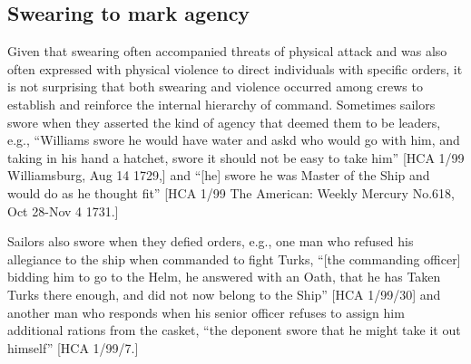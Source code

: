 \subsection{\textbf{Swearing} \textbf{to} \textbf{mark} \textbf{agency}}%

  Given that swearing often accompanied threats of physical attack and was also often expressed with physical violence to direct individuals with specific orders, it is not surprising that both swearing and violence occurred among crews to establish and reinforce the internal hierarchy of command. Sometimes sailors swore when they asserted the kind of agency that deemed them to be leaders, e.g., “Williams swore he would have water and askd who would go with him, and taking in his hand a hatchet, swore it should not be easy to take him” [HCA 1/99 Williamsburg, Aug 14 1729,] and “[he] swore he was Master of the Ship and would do as he thought fit” [HCA 1/99 The American: Weekly Mercury No.618, Oct 28-Nov 4 1731.] 

Sailors also swore when they defied orders, e.g., one man who refused his allegiance to the ship when commanded to fight Turks, “[the commanding officer] bidding him to go to the Helm, he answered with an Oath, that he has Taken Turks there enough, and did not now belong to the Ship” [HCA 1/99/30] and another man who responds when his senior officer refuses to assign him additional rations from the casket, “the deponent swore that he might take it out himself” [HCA 1/99/7.] 

